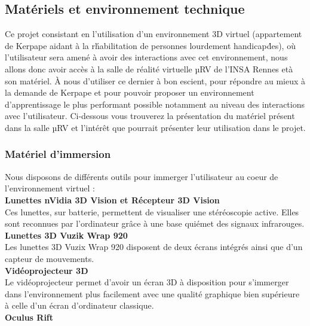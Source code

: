 \subsection{Mat\'eriels et environnement technique}

Ce projet consistant en l'utilisation d'un environnement 3D virtuel (appartement de Kerpape aidant \`a la r\'habilitation de personnes lourdement handicap\'des), o\`u l'utilisateur sera amen\'e \`a avoir des interactions avec cet environnement, nous allons donc avoir acc\`es \`a la salle de r\'ealit\'e virtuelle µRV de l'INSA Rennes et\`a son mat\'eriel. \`A nous d'utiliser ce dernier \`a bon escient, pour r\'epondre au mieux \`a la demande de Kerpape et pour pouvoir proposer un environnement d'apprentissage le plus performant possible notamment au niveau des interactions avec l'utilisateur. 
Ci-dessous vous trouverez la pr\'esentation du mat\'eriel pr\'esent dans la salle µRV et l'int\'er\^et que pourrait pr\'esenter leur utilisation dans le projet.

\subsubsection{Mat\'eriel d'immersion}
Nous disposons de diff\'erents outils pour immerger l'utilisateur au coeur de l'environnement virtuel : 
\\

\textbf{Lunettes nVidia 3D Vision et R\'ecepteur 3D Vision}
\\

Ces lunettes, sur batterie, permettent de visualiser une st\'er\'eoscopie active. Elles sont reconnues par l'ordinateur gr\^ace \`a une base qui\'emet des signaux infrarouges.
\\

\textbf{Lunettes 3D Vuzik Wrap 920}
\\

Les lunettes 3D Vuzix Wrap 920 disposent de deux \'ecrans int\'egr\'es ainsi que d'un capteur de mouvements.
\\

\textbf{Vid\'eoprojecteur 3D}
\\

Le vid\'eoprojecteur permet d'avoir un \'ecran 3D \`a disposition pour s'immerger dans l'environnement plus facilement avec une qualit\'e graphique bien sup\'erieure \`a celle d'un \'ecran d'ordinateur classique.
\\


\textbf{Oculus Rift}
\\


